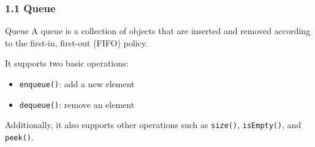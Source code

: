 \documentclass[aspectratio=169, 14pt]{beamer}
\begin{document}
\begin{frame}
    \frametitle{1.1 Queue}

    \begin{exampleblock}{Queue}
        A queue is a collection of objects that are inserted and removed according to the 
        \alert{first-in, first-out (FIFO)} policy.        
    \end{exampleblock}
    \pause
    It supports two basic operations:
    \begin{itemize}
        \item \texttt{enqueue()}: add a new element
        \item \texttt{dequeue()}: remove an element
    \end{itemize}
    Additionally, it also supports other operations such as \texttt{size()}, \texttt{isEmpty()}, and \texttt{peek()}.
\end{frame}
\end{document}
